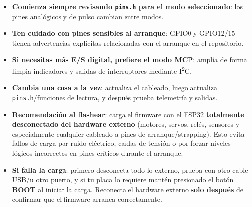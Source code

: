 \begin{itemize}
    \item \textbf{Comienza siempre revisando \texttt{pins.h} para el modo seleccionado}: los pines analógicos y de pulso cambian entre modos.
    \item \textbf{Ten cuidado con pines sensibles al arranque}: GPIO0 y GPIO12/15 tienen advertencias explícitas relacionadas con el arranque en el repositorio.
    \item \textbf{Si necesitas más E/S digital, prefiere el modo MCP}: amplía de forma limpia indicadores y salidas de interruptores mediante I\textsuperscript{2}C.
    \item \textbf{Cambia una cosa a la vez}: actualiza el cableado, luego actualiza \texttt{pins.h}/funciones de lectura, y después prueba telemetría y salidas.
    \item \textbf{Recomendación al flashear}: carga el firmware con el ESP32 \textbf{totalmente desconectado del hardware externo} (motores, servos, relés, sensores y especialmente cualquier cableado a pines de arranque/strapping). Esto evita fallos de carga por ruido eléctrico, caídas de tensión o por forzar niveles lógicos incorrectos en pines críticos durante el arranque.
    \item \textbf{Si falla la carga}: primero desconecta todo lo externo, prueba con otro cable USB/u otro puerto, y si tu placa lo requiere mantén presionado el botón \textbf{BOOT} al iniciar la carga. Reconecta el hardware externo \textbf{solo después} de confirmar que el firmware arranca correctamente.
\end{itemize}